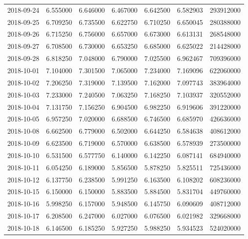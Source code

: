 \begin{tabular}{lrrrrrr}
2018-09-24 &    6.555000 &    6.646000 &    6.467000 &    6.642500 &    6.582903 &   293912000 \\
2018-09-25 &    6.709250 &    6.735500 &    6.622750 &    6.710250 &    6.650045 &   280388000 \\
2018-09-26 &    6.715250 &    6.756000 &    6.657000 &    6.673000 &    6.613131 &   268548000 \\
2018-09-27 &    6.708500 &    6.730000 &    6.653250 &    6.685000 &    6.625022 &   214428000 \\
2018-09-28 &    6.818250 &    7.048000 &    6.790000 &    7.025500 &    6.962467 &   709396000 \\
2018-10-01 &    7.104000 &    7.301500 &    7.065000 &    7.234000 &    7.169096 &   622060000 \\
2018-10-02 &    7.206250 &    7.319000 &    7.139500 &    7.162000 &    7.097743 &   383964000 \\
2018-10-03 &    7.233000 &    7.240500 &    7.063250 &    7.168250 &    7.103937 &   320552000 \\
2018-10-04 &    7.131750 &    7.156250 &    6.904500 &    6.982250 &    6.919606 &   391220000 \\
2018-10-05 &    6.957250 &    7.020000 &    6.688500 &    6.746500 &    6.685970 &   426636000 \\
2018-10-08 &    6.662500 &    6.779000 &    6.502000 &    6.644250 &    6.584638 &   408612000 \\
2018-10-09 &    6.623500 &    6.719000 &    6.570000 &    6.638500 &    6.578939 &   273500000 \\
2018-10-10 &    6.531500 &    6.577750 &    6.140000 &    6.142250 &    6.087141 &   684940000 \\
2018-10-11 &    6.054250 &    6.189000 &    5.856500 &    5.878250 &    5.825511 &   725436000 \\
2018-10-12 &    6.137750 &    6.238500 &    5.991250 &    6.163500 &    6.108202 &   608236000 \\
2018-10-15 &    6.150000 &    6.150000 &    5.883500 &    5.884500 &    5.831704 &   449760000 \\
2018-10-16 &    5.998250 &    6.157000 &    5.948500 &    6.145750 &    6.090609 &   408712000 \\
2018-10-17 &    6.208500 &    6.247000 &    6.027000 &    6.076500 &    6.021982 &   329668000 \\
2018-10-18 &    6.146500 &    6.185250 &    5.927250 &    5.988250 &    5.934523 &   524020000 \\

\end{tabular}
